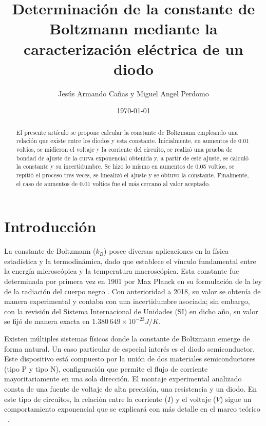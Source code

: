 \documentclass[twocolumn]{article} %
\begin{document}
\title{Determinación de la constante de Boltzmann mediante la caracterización eléctrica de un diodo}
\author{Jesús Armando Cañas y Miguel Angel Perdomo}
\date{\today}


\maketitle
\begin{abstract}

   El presente artículo se propone calcular la constante de Boltzmann empleando una relación que existe entre los diodos y esta constante. Inicialmente, en aumentos de 0.01 voltios, se midieron el voltaje y la corriente del circuito, se realizó una prueba de bondad de ajuste de la curva exponencial obtenida y, a partir de este ajuste, se calculó la constante y su incertidumbre. Se hizo lo mismo en aumentos de 0.05 voltios, se repitió el proceso tres veces, se linealizó el ajuste y se obtuvo la constante. Finalmente, el caso de aumentos de 0.01 voltios fue el más cercano al valor aceptado.

\end{abstract}
\vspace{2cm} 

\section{Introducción}
\vspace{-0.3cm}
La constante de Boltzmann ($k_B$) posee diversas aplicaciones en la física estadística y la termodinámica, dado que establece el vínculo fundamental entre la energía microscópica y la temperatura macroscópica. Esta constante fue determinada por primera vez en 1901 por Max Planck en su formulación de la ley de la radiación del cuerpo negro \cite{Planck1901}. Con anterioridad a 2018, su valor se obtenía de manera experimental y contaba con una incertidumbre asociada; sin embargo, con la revisión del Sistema Internacional de Unidades (SI) en dicho año, su valor se fijó de manera exacta en $1.380\,649\times 10^{-23} J/K$\cite{Stock2019}.

Existen múltiples sistemas físicos donde la constante de Boltzmann emerge de forma natural. Un caso particular de especial interés es el diodo semiconductor. Este dispositivo está compuesto por la unión de dos materiales semiconductores (tipo P y tipo N), configuración que permite el flujo de corriente mayoritariamente en una sola dirección. El montaje experimental analizado consta de una fuente de voltaje de alta precisión, una resistencia y un diodo. En este tipo de circuitos, la relación entre la corriente ($I$) y el voltaje ($V$) sigue un comportamiento exponencial que se explicará con más detalle en el marco teórico ~\cite{leon2014}.
\end{document}
